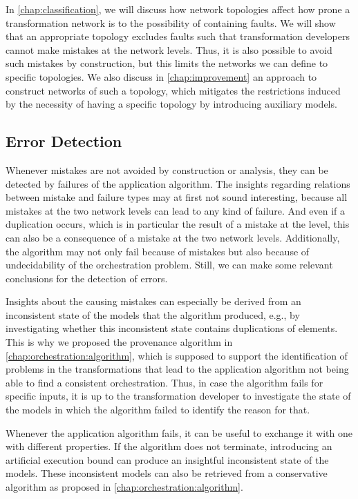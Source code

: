 In \autoref{chap:classification}, we will discuss how network topologies affect how prone a transformation network is to the possibility of containing faults.
We will show that an appropriate topology excludes faults such that transformation developers cannot make mistakes at the network levels.
Thus, it is also possible to avoid such mistakes by construction, but this limits the networks we can define to specific topologies.
We also discuss in \autoref{chap:improvement} an approach to construct networks of such a topology, which mitigates the restrictions induced by the necessity of having a specific topology by introducing auxiliary models.


\subsection{Error Detection}

Whenever mistakes are not avoided by construction or analysis, they can be detected by failures of the application algorithm.
The insights regarding relations between mistake and failure types may at first not sound interesting, because all mistakes at the two network levels can lead to any kind of failure.
And even if a duplication occurs, which is in particular the result of a mistake at the \leveltransformation level, this can also be a consequence of a mistake at the two network levels.
Additionally, the algorithm may not only fail because of mistakes but also because of undecidability of the orchestration problem.
Still, we can make some relevant conclusions for the detection of errors.

Insights about the causing mistakes can especially be derived from an inconsistent state of the models that the algorithm produced, e.g., by investigating whether this inconsistent state contains duplications of elements.
This is why we proposed the provenance algorithm in \autoref{chap:orchestration:algorithm}, which is supposed to support the identification of problems in the transformations that lead to the application algorithm not being able to find a consistent orchestration.
Thus, in case the algorithm fails for specific inputs, it is up to the transformation developer to investigate the state of the models in which the algorithm failed to identify the reason for that.

Whenever the application algorithm fails, it can be useful to exchange it with one with different properties.
If the algorithm does not terminate, introducing an artificial execution bound can produce an insightful inconsistent state of the models.
These inconsistent models can also be retrieved from a conservative algorithm as proposed in \autoref{chap:orchestration:algorithm}.


